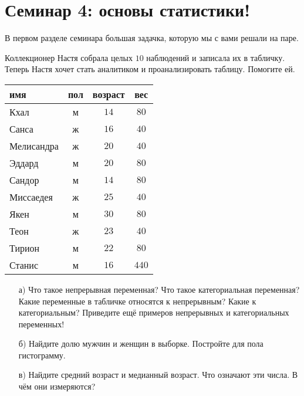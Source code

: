 \documentclass[12pt, a4paper, oneside]{article}
\theoremstyle{plain} %
\theoremstyle{definition}
\begin{document}

\toggletrue{lecture}


\section*{Семинар 4: основы статистики!}


В первом разделе семинара большая задачка, которую мы с вами решали на паре. 

\begin{problem}
Коллекционер Настя собрала целых $10$ наблюдений и записала их в табличку. Теперь Настя хочет стать аналитиком и проанализировать таблицу. Помогите ей. 

\begin{center}
	\begin{tabular}{lccc}
		\toprule
		имя & пол  & возраст  & вес  \\ \midrule
		Кхал & м  & $14$ &   $80$  \\
		Санса & ж & $16$ &  $40$  \\
		Мелисандра & ж & $20$ &  $40$   \\
		Эддард & м & $20$ &   $80$ \\
		Сандор & м & $14$ &   $80$ \\
		Миссаедея & ж & $25$ &   $40$\\
		Якен & м & $30$ &   $80$\\
		Теон & ж & $23$ &    $40$\\
		Тирион & м & $22$ &    $80$\\
		Станис & м & $16$  &    $440$\\ \bottomrule
	\end{tabular}	
\end{center}

\begin{enumerate}
	\item[а)] Что такое непрерывная переменная? Что такое категориальная переменная? Какие переменные в табличке относятся к непрерывным? Какие к категориальным?  Приведите ещё примеров непрерывных и категориальных переменных! 
	
	\item[б)]  Найдите долю мужчин и женщин в выборке. Постройте для пола гистограмму. 
	
	\item[в)] Найдите средний возраст и медианный возраст.  Что означают эти числа. В чём они измеряются? 


\end{enumerate}
\end{problem}
\end{document}
